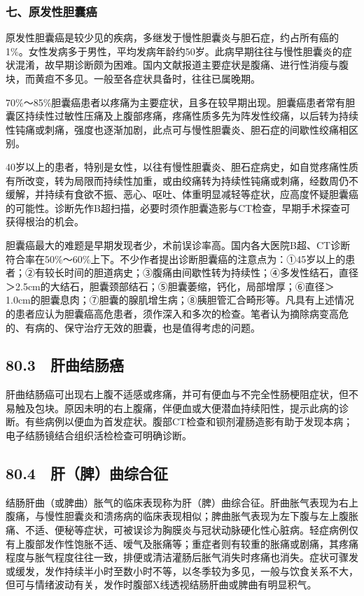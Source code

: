 \subsubsection{七、原发性胆囊癌}

原发性胆囊癌是较少见的疾病，多继发于慢性胆囊炎与胆石症，约占所有癌的1\%。女性发病多于男性，平均发病年龄约50岁。此病早期往往与慢性胆囊炎的症状混淆，故早期诊断颇为困难。国内文献报道主要症状是腹痛、进行性消瘦与腹块，而黄疸不多见。一般至各症状具备时，往往已属晚期。

70\%～85\%胆囊癌患者以疼痛为主要症状，且多在较早期出现。胆囊癌患者常有胆囊区持续性过敏性压痛及上腹部疼痛，疼痛性质多先为阵发性绞痛，以后转为持续性钝痛或刺痛，强度也逐渐加剧，此点可与慢性胆囊炎、胆石症的间歇性绞痛相区别。

40岁以上的患者，特别是女性，以往有慢性胆囊炎、胆石症病史，如自觉疼痛性质有所改变，转为局限而持续性加重，或由绞痛转为持续性钝痛或刺痛，经数周仍不缓解，并持续有食欲不振、恶心、呕吐、体重明显减轻等症状，应高度怀疑胆囊癌的可能性。诊断先作B超扫描，必要时须作胆囊造影与CT检查，早期手术探查可获得根治的机会。

胆囊癌最大的难题是早期发现者少，术前误诊率高。国内各大医院B超、CT诊断符合率在50\%～60\%上下。不少作者提出诊断胆囊癌的注意点为：①45岁以上的患者；②有较长时间的胆道病史；③腹痛由间歇性转为持续性；④多发性结石，直径＞2.5cm的大结石，胆囊颈部结石；⑤胆囊萎缩，钙化，局部增厚；⑥直径＞1.0cm的胆囊息肉；⑦胆囊的腺肌增生病；⑧胰胆管汇合畸形等。凡具有上述情况的患者应认为胆囊癌高危患者，须作深入和多次的检查。笔者认为摘除病变高危的、有病的、保守治疗无效的胆囊，也是值得考虑的问题。

\subsection{80.3　肝曲结肠癌}

肝曲结肠癌可出现右上腹不适感或疼痛，并可有便血与不完全性肠梗阻症状，但不易触及包块。原因未明的右上腹痛，伴便血或大便潜血持续阳性，提示此病的诊断。有些病例以便血为首发症状。腹部CT检查和钡剂灌肠造影有助于发现本病；电子结肠镜结合组织活检检查可明确诊断。

\subsection{80.4　肝（脾）曲综合征}

结肠肝曲（或脾曲）胀气的临床表现称为肝（脾）曲综合征。肝曲胀气表现为右上腹痛，与慢性胆囊炎和溃疡病的临床表现相似；脾曲胀气表现为左下腹与左上腹胀痛、不适、便秘等症状，可被误诊为胸膜炎与冠状动脉硬化性心脏病。轻症病例仅有上腹部发作性饱胀不适、嗳气及胀痛等；重症者则有较重的胀痛或剧痛，其疼痛程度与胀气程度往往一致，排便或清洁灌肠后胀气消失时疼痛也消失。症状可骤发或缓发，发作持续半小时至数小时不等，以冬季较为多见，一般与饮食关系不大，但可与情绪波动有关，发作时腹部X线透视结肠肝曲或脾曲有明显积气。

